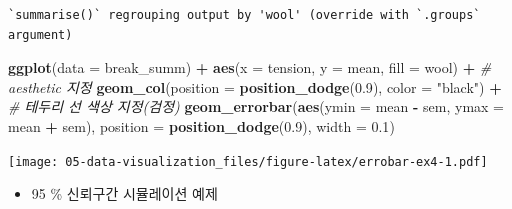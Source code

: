 \documentclass[
  11pt,
]{krantz}
\newenvironment{Shaded}{\begin{snugshade}}{\end{snugshade}}
\newcommand{\CommentTok}[1]{\textcolor[rgb]{0.37,0.37,0.37}{\textit{#1}}}
\newcommand{\DataTypeTok}[1]{\textcolor[rgb]{0.27,0.27,0.27}{#1}}
\newcommand{\FloatTok}[1]{\textcolor[rgb]{0.06,0.06,0.06}{#1}}
\newcommand{\KeywordTok}[1]{\textcolor[rgb]{0.27,0.27,0.27}{\textbf{#1}}}
\newcommand{\NormalTok}[1]{#1}
\newcommand{\OperatorTok}[1]{\textcolor[rgb]{0.43,0.43,0.43}{\textbf{#1}}}
\newcommand{\StringTok}[1]{\textcolor[rgb]{0.5,0.5,0.5}{#1}}
\providecommand{\tightlist}{%
  \setlength{\itemsep}{0pt}\setlength{\parskip}{0pt}}
\begin{document}
\begin{verbatim}
`summarise()` regrouping output by 'wool' (override with `.groups` argument)
\end{verbatim}

\begin{Shaded}
\begin{Highlighting}[]
\KeywordTok{ggplot}\NormalTok{(}\DataTypeTok{data =}\NormalTok{ break_summ) }\OperatorTok{+}\StringTok{ }
\StringTok{  }\KeywordTok{aes}\NormalTok{(}\DataTypeTok{x =}\NormalTok{ tension, }\DataTypeTok{y =}\NormalTok{ mean, }\DataTypeTok{fill =}\NormalTok{ wool) }\OperatorTok{+}\StringTok{ }\CommentTok{# aesthetic 지정}
\StringTok{  }\KeywordTok{geom_col}\NormalTok{(}\DataTypeTok{position =} \KeywordTok{position_dodge}\NormalTok{(}\FloatTok{0.9}\NormalTok{), }
           \DataTypeTok{color =} \StringTok{"black"}\NormalTok{) }\OperatorTok{+}\StringTok{ }\CommentTok{# 테두리 선 색상 지정(검정)}
\StringTok{  }\KeywordTok{geom_errorbar}\NormalTok{(}\KeywordTok{aes}\NormalTok{(}\DataTypeTok{ymin =}\NormalTok{ mean }\OperatorTok{-}\StringTok{ }\NormalTok{sem, }
                    \DataTypeTok{ymax =}\NormalTok{ mean }\OperatorTok{+}\StringTok{ }\NormalTok{sem), }
                \DataTypeTok{position =} \KeywordTok{position_dodge}\NormalTok{(}\FloatTok{0.9}\NormalTok{), }
                \DataTypeTok{width =} \FloatTok{0.1}\NormalTok{)}
\end{Highlighting}
\end{Shaded}

\texttt{[image: 05-data-visualization\_files/figure-latex/errobar-ex4-1.pdf]}

\normalsize

\begin{itemize}
\tightlist
\item
  95 \% 신뢰구간 시뮬레이션 예제
\end{itemize}

\footnotesize
\end{document}
